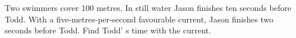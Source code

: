 Two swimmers cover 100 metres. In still water Jason finishes ten seconds before Todd. With a five-metres-per-second favourable current, Jason finishes two seconds before Todd. Find Todd' s time with the current.
